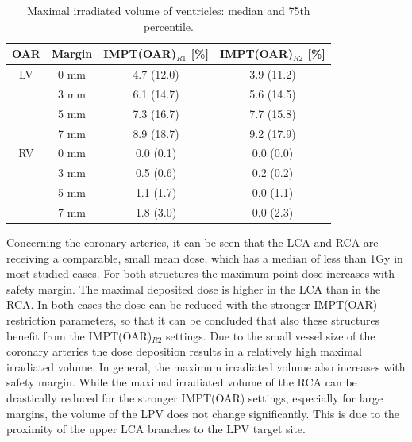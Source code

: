 \begin{table}[H]
  \centering
      \footnotesize
  \caption{Maximal irradiated volume of ventricles: median and 75th percentile.}
  \begin{tabular}{|c|c|c|c|}
    \hline\hline
    OAR & Margin & IMPT(OAR)$_{R1}$ [\%] & IMPT(OAR)$_{R2}$ [\%] \\
    \hline
    LV & 0 mm & 4.7 (12.0) & 3.9 (11.2) \\
    & 3 mm & 6.1 (14.7) & 5.6 (14.5) \\
    & 5 mm & 7.3 (16.7) & 7.7 (15.8) \\
    & 7 mm & 8.9 (18.7) & 9.2 (17.9) \\
     \hline
    RV & 0 mm & 0.0 (0.1) &  0.0 (0.0) \\
    & 3 mm & 0.5 (0.6) & 0.2 (0.2) \\
    & 5 mm & 1.1 (1.7) & 0.0 (1.1) \\
    & 7 mm & 1.8 (3.0) & 0.0 (2.3) \\ 
    \hline\hline
  \end{tabular}
  \label{tab:maxvolume_ventricle}
\end{table}

\newpage 


Concerning the coronary arteries, it can be seen that the LCA and RCA are receiving a comparable, small mean dose, which has a median of 
less than 1Gy in most studied cases. 
For both structures the maximum point dose increases with safety margin. The maximal deposited dose is higher in the LCA than in the RCA. 
In both cases the dose can be reduced with the stronger IMPT(OAR) restriction parameters, so that it can be concluded that also these 
structures benefit from the IMPT(OAR)$_{R2}$ settings. 
Due to the small vessel size of the coronary arteries the dose deposition results in a relatively high maximal irradiated volume. 
In general, the maximum irradiated volume also increases with safety margin. While the maximal irradiated volume of the RCA can be 
drastically reduced for the stronger IMPT(OAR) settings, especially for large margins, the volume of the LPV does not change significantly. 
This is due to the proximity of the upper LCA branches to the LPV target site. 


